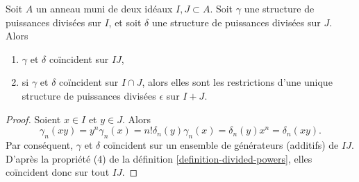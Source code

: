 \begin{lemma}
\label{lemma-two-ideals}
Soit $A$ un anneau muni de deux idéaux $I, J \subset A$.
Soit $\gamma$ une structure de puissances divisées sur $I$, et soit
$\delta$ une structure de puissances divisées sur $J$.
Alors
\begin{enumerate}
\item $\gamma$ et $\delta$ coïncident sur $IJ$,
\item si $\gamma$ et $\delta$ coïncident sur $I \cap J$, alors elles
sont les restrictions d'une unique structure de puissances divisées $\epsilon$
sur $I + J$.
\end{enumerate}
\end{lemma}

\begin{proof}
Soient $x \in I$ et $y \in J$. Alors
$$
\gamma_n(xy) = y^n\gamma_n(x) = n! \delta_n(y) \gamma_n(x) =
\delta_n(y) x^n = \delta_n(xy).
$$
Par conséquent, $\gamma$ et $\delta$ coïncident sur un ensemble de générateurs (additifs)
de $IJ$. D'après la propriété (4) de la définition \ref{definition-divided-powers},
elles coïncident donc sur tout $IJ$.


\end{proof}
